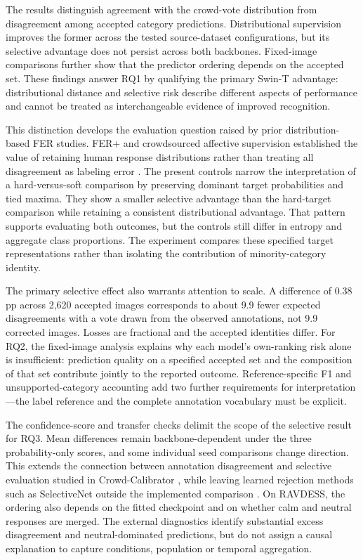 The results distinguish agreement with the crowd-vote distribution from disagreement among accepted category predictions. Distributional supervision improves the former across the tested source-dataset configurations, but its selective advantage does not persist across both backbones. Fixed-image comparisons further show that the predictor ordering depends on the accepted set. These findings answer RQ1 by qualifying the primary Swin-T advantage: distributional distance and selective risk describe different aspects of performance and cannot be treated as interchangeable evidence of improved recognition.

This distinction develops the evaluation question raised by prior distribution-based FER studies. FER+ and crowdsourced affective supervision established the value of retaining human response distributions rather than treating all disagreement as labeling error \cite{barsoum2016ferplus,washington2021crowdsourcing}. The present controls narrow the interpretation of a hard-versus-soft comparison by preserving dominant target probabilities and tied maxima. They show a smaller selective advantage than the hard-target comparison while retaining a consistent distributional advantage. That pattern supports evaluating both outcomes, but the controls still differ in entropy and aggregate class proportions. The experiment compares these specified target representations rather than isolating the contribution of minority-category identity.

The primary selective effect also warrants attention to scale. A difference of 0.38 pp across 2,620 accepted images corresponds to about 9.9 fewer expected disagreements with a vote drawn from the observed annotations, not 9.9 corrected images. Losses are fractional and the accepted identities differ. For RQ2, the fixed-image analysis explains why each model's own-ranking risk alone is insufficient: prediction quality on a specified accepted set and the composition of that set contribute jointly to the reported outcome. Reference-specific F1 and unsupported-category accounting add two further requirements for interpretation---the label reference and the complete annotation vocabulary must be explicit.

The confidence-score and transfer checks delimit the scope of the selective result for RQ3. Mean differences remain backbone-dependent under the three probability-only scores, and some individual seed comparisons change direction. This extends the connection between annotation disagreement and selective evaluation studied in Crowd-Calibrator \cite{khurana2024crowd}, while leaving learned rejection methods such as SelectiveNet outside the implemented comparison \cite{geifman2019selectivenet}. On RAVDESS, the ordering also depends on the fitted checkpoint and on whether calm and neutral responses are merged. The external diagnostics identify substantial excess disagreement and neutral-dominated predictions, but do not assign a causal explanation to capture conditions, population or temporal aggregation.

